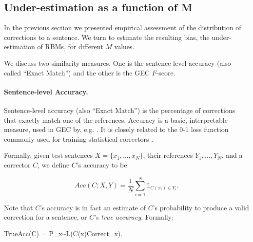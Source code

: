 \documentclass[letter,11pt]{article}
\newenvironment{myequation}{
  \vspace{-1em}
 \begin{equation}
}{
 \end{equation}
 \vspace{-1.2em}
}
\newenvironment{myequation*}{
	\vspace{-1em}
	\begin{equation*}
}{
\end{equation*}
\vspace{-1.2em}
}
\begin{document}
\subsection{Under-estimation as a function of M} \label{subsec:Assessment-values}
In the previous section we presented empirical assessment of the distribution of corrections to a sentence. We turn to estimate the resulting bias, the under-estimation of RBMs, for different $M$ values. 

We discuss two similarity measures. One is the sentence-level accuracy
(also called ``Exact Match'') and the other is the GEC $F$-score.

\paragraph{Sentence-level Accuracy.}
Sentence-level accuracy (also ``Exact Match'') is the percentage of corrections that
exactly match one of the references.
Accuracy is a basic, interpretable measure, used in GEC by, e.g. \cite{rozovskaya2010annotating}.
It is closely related to the 0-1 loss function commonly used
for training statistical correctors \cite{chodorow2012problems,rozovskaya2013joint}. 

Formally, given test sentences $X=\{x_1,\ldots,x_N\}$,
their references $Y_1,\ldots,Y_N$, and a corrector $C$,
we define $C$'s accuracy to be

\begin{small}
\vspace{-0.15cm}
  \centering
  \begin{myequation}\label{eq:acc_def}
    Acc\left(C;X,Y\right) = \frac{1}{N} \sum_{i=1}^N \mathds{1}_{C(x_i) \in Y_i}.
  \end{myequation}
\end{small}

Note that $C$'s accuracy is in fact an estimate of $C$'s probability to produce
a valid correction for a sentence, or $C$'s {\it true accuracy}. Formally:

 \begin{small}
   \centering
   \vspace{-0.2cm}
   \begin{myequation*}
     TrueAcc\left(C\right) = P_{x\sim{L}}\left(C\left(x\right)\in Correct_x\right).
   \end{myequation*}
   \vspace{-0.15cm}
 \end{small}
%
\end{document}
